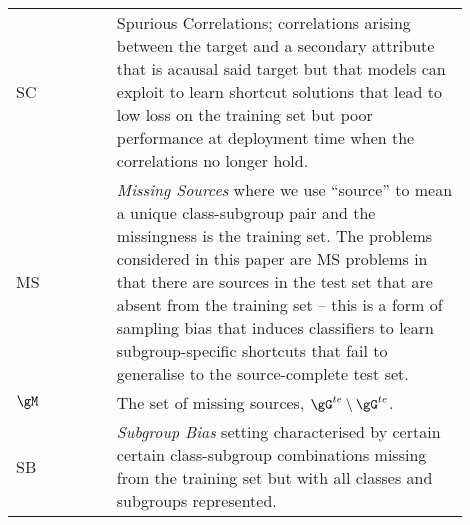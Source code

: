 \begin{table}[ht]
\begin{tabular}{p{0.2\linewidth} | p{0.7\linewidth}}
SC & Spurious Correlations; correlations arising between the target and a secondary attribute
that is acausal \wrt{} said target but that models can exploit to learn shortcut solutions 
that lead to low loss on the training set but poor performance at deployment time when the
correlations no longer hold. \\
MS & \emph{Missing Sources} where we use ``source'' to mean a unique class-subgroup pair and
the missingness is \wrt{} the training set. The problems considered in this paper are MS problems
in that there are sources in the test set that are absent from the training set -- this is a form
of sampling bias that induces classifiers to learn subgroup-specific shortcuts that fail to
generalise to the source-complete test set. \\
$\gM$ & The set of missing sources, $\gG^{te} \setminus \gG^{te}$. \\
SB & \emph{Subgroup Bias} setting characterised by certain certain class-subgroup combinations
missing from the training set but with all classes and subgroups represented. \\
%
\bottomrule
%
\end{tabular}
%
\end{table}

